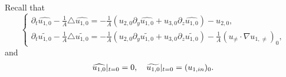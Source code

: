 \documentclass[12pt, reqno]{amsart}
\numberwithin{equation}{section}
\begin{document}
	
	Recall that 
	\begin{equation}\label{u_zero_2}
		\left\{
		\begin{array}{lr}
			\partial_t\widehat{u_{1,0}}-\frac{1}{A}\triangle\widehat{u_{1,0}}
			=-\frac{1}{A}(u_{2,0}\partial_y\widehat{u_{1,0}}+u_{3,0}\partial_z\widehat{u_{1,0}})-u_{2,0},\\
			\partial_t\widetilde{u_{1,0}}-\frac{1}{A}\triangle\widetilde{u_{1,0}}
			=-\frac{1}{A}(u_{2,0}\partial_y\widetilde{u_{1,0}}+u_{3,0}\partial_z\widetilde{u_{1,0}})-\frac{1}{A}(u_{\neq}\cdot \nabla u_{1,\neq})_0,
		\end{array}
		\right.
	\end{equation}
	and 
	\begin{equation*}
		\begin{aligned}
			\widehat{u_{1,0}}|_{t=0}=0,~~~ 
			\widetilde{u_{1,0}}|_{t=0}=(u_{1,\rm in})_0.
		\end{aligned}
	\end{equation*}
	
\end{document}
